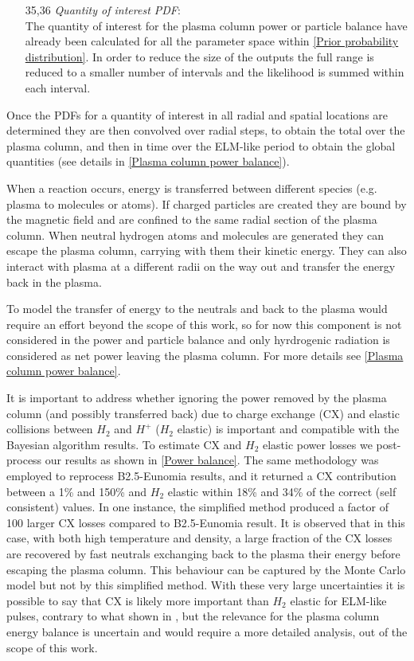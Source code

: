 \begin{enumerate}
    \item[35,36] \emph{Quantity of interest PDF}: \\The quantity of interest for the plasma column power or particle balance have already been calculated for all the parameter space within \autoref{Prior probability distribution}. In order to reduce the size of the outputs the full range is reduced to a smaller number of intervals and the likelihood is summed within each interval.
\end{enumerate}


Once the PDFs for a quantity of interest in all radial and spatial locations are determined they are then convolved over radial steps, to obtain the total over the plasma column, and then in time over the ELM-like period to obtain the global quantities (see details in \autoref{Plasma column power balance}).

When a reaction occurs, energy is transferred between different species (e.g. plasma to molecules or atoms). If charged particles are created they are bound by the magnetic field and are confined to the same radial section of the plasma column. When neutral hydrogen atoms and molecules are generated they can escape the plasma column, carrying with them their kinetic energy. They can also interact with plasma at a different radii on the way out and  transfer the energy back in the plasma.

To model the transfer of energy to the neutrals and back to the plasma would require an effort beyond the scope of this work, so for now this component is not considered in the power and particle balance and only hyrdrogenic radiation is considered as net power leaving the plasma column. For more details see \autoref{Plasma column power balance}. 

It is important to address whether ignoring the power removed by the plasma column (and possibly transferred back) due to charge exchange (CX) and elastic collisions between $H_2$ and $H^+$ ($H_2$ elastic) is important and compatible with the Bayesian algorithm results. To estimate CX and $H_2$ elastic power losses we post-process our results as shown in \autoref{Power balance}. The same methodology was employed to reprocess B2.5-Eunomia results, and it returned a CX contribution between  a 1\% and 150\% and $H_2$ elastic within 18\% and 34\% of the correct (self consistent) values. In one instance, the simplified method produced a factor of 100 larger CX losses compared to B2.5-Eunomia result. It is observed that in this case, with both high temperature and density, a large fraction of the CX losses are recovered by fast neutrals exchanging back to the plasma their energy before escaping the plasma column. This behaviour can be captured by the Monte Carlo model but not by this simplified method. With these very large uncertainties it is possible to say that CX is likely more important than $H_2$ elastic for ELM-like pulses, contrary to what shown in \cite{Chandra2022}, but the relevance for the plasma column energy balance is uncertain and would require a more detailed analysis, out of the scope of this work.


